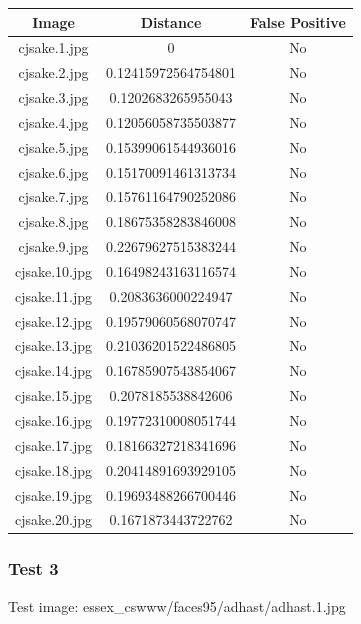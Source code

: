 \documentclass[12pt]{article}
\begin{document}
\begin{center}
\begin{tabular}{ccc}
Image & Distance & False Positive \\
\hline
cjsake.1.jpg & 0 & No \\
cjsake.2.jpg & 0.12415972564754801 & No \\
cjsake.3.jpg & 0.1202683265955043 & No \\
cjsake.4.jpg & 0.12056058735503877 & No \\
cjsake.5.jpg & 0.15399061544936016 & No \\
cjsake.6.jpg & 0.15170091461313734 & No \\
cjsake.7.jpg & 0.15761164790252086 & No \\
cjsake.8.jpg & 0.18675358283846008 & No \\
cjsake.9.jpg & 0.22679627515383244 & No \\
cjsake.10.jpg & 0.16498243163116574 & No \\
cjsake.11.jpg & 0.2083636000224947 & No \\
cjsake.12.jpg & 0.19579060568070747 & No \\
cjsake.13.jpg & 0.21036201522486805 & No \\
cjsake.14.jpg & 0.16785907543854067 & No \\
cjsake.15.jpg & 0.2078185538842606 & No \\
cjsake.16.jpg & 0.19772310008051744 & No \\
cjsake.17.jpg & 0.18166327218341696 & No \\
cjsake.18.jpg & 0.20414891693929105 & No \\
cjsake.19.jpg & 0.19693488266700446 & No \\
cjsake.20.jpg & 0.1671873443722762 & No \\
\end{tabular}
\end{center}

\subsubsection{Test 3}
Test image: essex\_cswww/faces95/adhast/adhast.1.jpg
\end{document}
